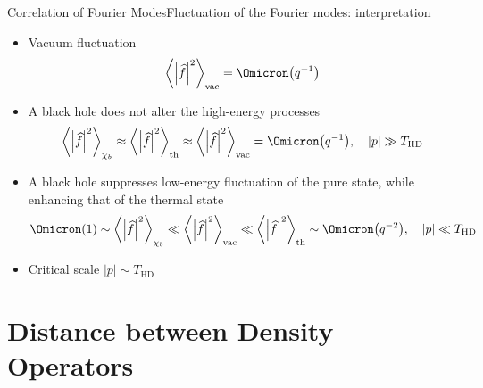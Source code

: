 \documentclass{beamer}
\newcommand{\abr}[1]{{\left<#1\right>}}
\newcommand{\vbr}[1]{{\left|#1\right|}}
\newcommand{\rfun}[2]{{#1}\mathopen{}\left(#2\right)\mathclose{}}
\newcommand{\what}[1]{{\widehat{#1}}}
\begin{document}
\begin{frame}{Correlation of Fourier Modes}{Fluctuation of the Fourier 
modes: interpretation}

\begin{itemize}
	\item Vacuum fluctuation
	\begin{equation}
	\abr{\vbr{\what{f}}^2}_\text{vac} = \rfun{\Omicron}{q^{-1}}
	\end{equation}

	\item A black hole does \alert{not} alter the \alert{high}-energy
	processes
	\begin{equation}
	\abr{\vbr{\what{f}}^2}_{\chi_b} \approx
	\abr{\vbr{\what{f}}^2}_\text{th} \approx
	\abr{\vbr{\what{f}}^2}_\text{vac} = \rfun{\Omicron}{q^{-1}},
	\quad \vbr{p} \gg T_\text{HD}
	\end{equation}

	\item A black hole \alert{suppresses} low-energy fluctuation of the
	\alert{pure} state, while \alert{enhancing} that of the
	\alert{thermal} state
	\begin{equation}
	\rfun{\Omicron}{1} \sim \abr{\vbr{\what{f}}^2}_{\chi_b} \ll
	\abr{\vbr{\what{f}}^2}_\text{vac} \ll
	\abr{\vbr{\what{f}}^2}_\text{th} \sim \rfun{\Omicron}{q^{-2}},
	\quad \vbr{p} \ll T_\text{HD}
	\end{equation}
	\item Critical scale $\vbr{p} \sim T_\text{HD}$
\end{itemize}

\end{frame}

\section{Distance between Density Operators}
\end{document}
